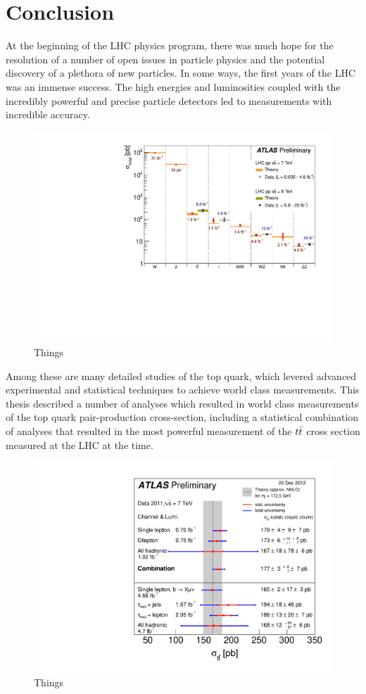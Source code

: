 

\chapter{Conclusion}

At the beginning of the LHC physics program, there was much hope for the
resolution of a number of open issues in particle physics and the potential
discovery of a plethora of new particles.
In some ways, the first years of the LHC was an immense success.
The high energies and luminosities coupled with the incredibly powerful
and precise particle detectors led to measurements with incredible
accuracy.

\begin{figure}[ht!]
  \begin{center}
    \includegraphics[width=.75\textwidth]{figures/conclusion/SM_SummaryPlotMoriondEWK2013}
    \caption{Things}
    \label{fig:xsec_vs_roots}
  \end{center}
\end{figure}


Among these are many detailed studies of the top quark, which levered
advanced experimental and statistical techniques to achieve world class measurements.
This thesis described a number of analyses which resulted in world class measurements
of the top quark pair-production cross-section, including a statistical combination
of analyses that resulted in the most powerful measurement of the $t\bar{t}$ cross
section measured at the LHC at the time.

\begin{figure}[ht!]
  \begin{center}
    \includegraphics[width=.75\textwidth]{figures/conclusion/tt_xsec20Dec2012}
    \caption{Things}
    \label{fig:xsec_vs_roots}
  \end{center}
\end{figure}
\clearpage

